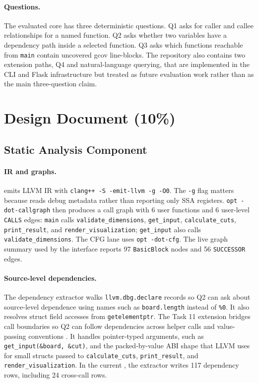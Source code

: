 \documentclass[11pt,twocolumn]{article}
\begin{document}
\paragraph{Questions.}
The evaluated core has three deterministic questions. Q1 asks for caller and
callee relationships for a named function. Q2 asks whether two variables have a
dependency path inside a selected function. Q3 asks which functions reachable
from \texttt{main} contain uncovered gcov line-blocks. The repository also
contains two extension paths, Q4 and natural-language querying, that are
implemented in the CLI and Flask infrastructure but treated as future
evaluation work rather than as the main three-question claim.

\section{Design Document (10\%)}

\subsection{Static Analysis Component}

\paragraph{IR and graphs.}
 emits LLVM IR \cite{llvm} with
\texttt{clang++ -S -emit-llvm -g -O0}. The \texttt{-g} flag matters because
 reads debug metadata rather than reporting
only SSA registers. \texttt{opt -dot-callgraph} then produces a call graph with
6 user functions and 6 user-level \texttt{CALLS} edges: \texttt{main} calls
\texttt{validate\_dimensions}, \texttt{get\_input}, \texttt{calculate\_cuts},
\texttt{print\_result}, and \texttt{render\_visualization};
\texttt{get\_input} also calls \texttt{validate\_dimensions}. The CFG lane uses
\texttt{opt -dot-cfg}. The live graph summary used by the interface reports 97
\texttt{BasicBlock} nodes and 56 \texttt{SUCCESSOR} edges.

\paragraph{Source-level dependencies.}
The dependency extractor walks \texttt{llvm.dbg.declare} records so Q2 can ask
about source-level dependence \cite{pdg} using names such as
\texttt{board.length} instead of \texttt{\%0}. It also resolves struct field
accesses from \texttt{getelementptr}. The Task 11 extension bridges call
boundaries so Q2 can follow dependencies across helper calls and value-passing
conventions \cite{andersen}. It handles pointer-typed arguments, such as
\texttt{get\_input(\&board, \&cut)}, and the packed-by-value ABI shape that LLVM
uses for small structs passed to \texttt{calculate\_cuts},
\texttt{print\_result}, and \texttt{render\_visualization}. In the current
, the extractor writes 117 dependency rows,
including 24 cross-call rows.
\end{document}
